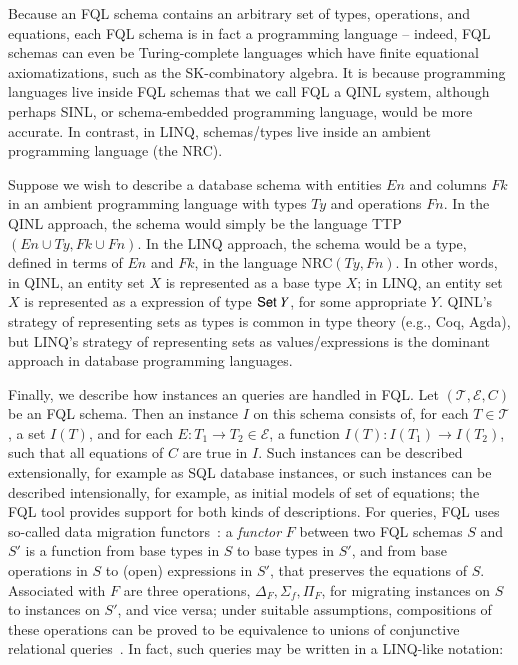 \documentclass[11pt]{article}
\def\to{\rightarrow}
\theoremstyle{remark}
\theoremstyle{definition}
\begin{document}
Because an FQL schema contains an arbitrary set of types, operations, and equations, each FQL schema is in fact a programming language -- indeed, FQL schemas can even be Turing-complete languages which have finite equational axiomatizations, such as the SK-combinatory algebra.  It is because programming languages live inside FQL schemas that we call FQL a QINL system, although perhaps SINL, or schema-embedded programming language, would be more accurate.  In contrast, in LINQ, schemas/types live inside an ambient programming language (the NRC).  

Suppose we wish to describe a database schema with entities $En$ and columns $Fk$ in an ambient programming language with types $Ty$ and operations $Fn$.  In the QINL approach, the schema would simply be the language TTP$(En \cup Ty, Fk \cup Fn)$.  In the LINQ approach, the schema would be a type, defined in terms of $En$ and $Fk$, in the language NRC$(Ty, Fn)$.  In other words, in QINL, an entity set $X$ is represented as a base type $X$; in LINQ, an entity set $X$ is represented as a expression of type ${\sf Set} \ Y$, for some appropriate $Y$.  QINL's  strategy of representing sets as types is common in type theory (e.g., Coq, Agda), but LINQ's strategy of representing sets as values/expressions is the dominant approach in database programming languages.  

Finally, we describe how instances an queries are handled in FQL. Let $(\mathcal{T}, \mathcal{E}, C)$ be an FQL schema.  Then an instance $I$ on this schema consists of, for each $T \in \mathcal{T}$, a set $I(T)$, and for each $E : T_1 \to T_2 \in \mathcal{E}$, a function $I(T) : I(T_1) \to I(T_2)$, such that all equations of $C$ are true in $I$.  Such instances can be described extensionally, for example as SQL database instances, or such instances can be described intensionally, for example, as initial models of set of equations; the FQL tool provides support for both kinds of descriptions.  For queries, FQL uses so-called data migration functors~\cite{Spivak:2012:FDM:2324905.2325108}: a {\it functor} $F$ between two FQL schemas $S$ and $S'$ is a function from base types in $S$ to base types in $S'$, and from base operations in $S$ to (open) expressions in $S'$, that preserves the equations of $S$.  Associated with $F$ are three operations, $\Delta_F, \Sigma_f, \Pi_F$, for migrating instances on $S$ to instances on $S'$, and vice versa; under suitable assumptions, compositions of these operations can be proved to be equivalence to unions of conjunctive relational queries~\cite{relfound}.  In fact, such queries may be written in a LINQ-like notation:
\end{document}
